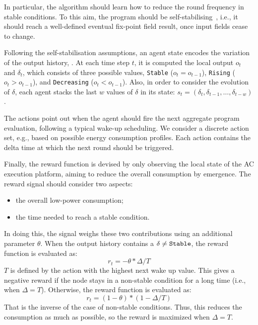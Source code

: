 In particular, the algorithm should learn how to reduce the round frequency in stable conditions. 
 To this aim, the program should be self-stabilising~\cite{DBLP:journals/tomacs/ViroliABDP18}, 
 i.e., it should reach a well-defined eventual fix-point field result, once input fields cease to change.

 Following the self-stabilisation assumptions, an agent state encodes the variation of the output history, .
 At each time step $t$, it is computed the local output $o_t$ and $\delta_t$, which consists of three possible values, \texttt{Stable} ($o_t = o_{t-1}$), \texttt{Rising} ($o_t > o_{t-1}$), and \texttt{Decreasing} ($o_ t < o_{t-1}$).
Also, in order to consider the evolution of $\delta$, each agent stacks the last $w$ values of $\delta$ in its state: $s_t =(\delta_t, \delta_{t-1}, \dots, \delta_{t-w})$.

The actions point out when the agent should fire the next aggregate program evaluation, following a typical wake-up scheduling.
%
We consider a discrete action set, e.g., based on possible energy consumption profiles.
% 
Each action contains the delta time at which the next round should be triggered. 

Finally, the reward function is devised by only observing the local state of the \ac{AC} execution platform, aiming to reduce the overall consumption by emergence.
%
The reward signal should consider two aspects: \begin{itemize}
    \item the overall low-power consumption;
    \item the time needed to reach a stable condition.
\end{itemize} 
In doing this, the signal weighs these two contributions using an additional parameter $\theta$.
 When the output history contains a $\delta \neq \text{\texttt{Stable}}$, the reward function is evaluated as:
\begin{equation}
r_t = - \theta * \Delta / T
\end{equation}
$T$ is defined by the action with the highest next wake up value.
%
This gives a negative reward if the node stays in a non-stable condition for a long time (i.e., when $\Delta = T$).
Otherwise, the reward function is evaluated as:
\begin{equation}
r_t = (1 - \theta) * (1 - \Delta / T)
\end{equation}
That is the inverse of the case of non-stable conditions. 
 Thus, this reduces the consumption as much as possible, so the reward is maximized when $\Delta = T$. 

